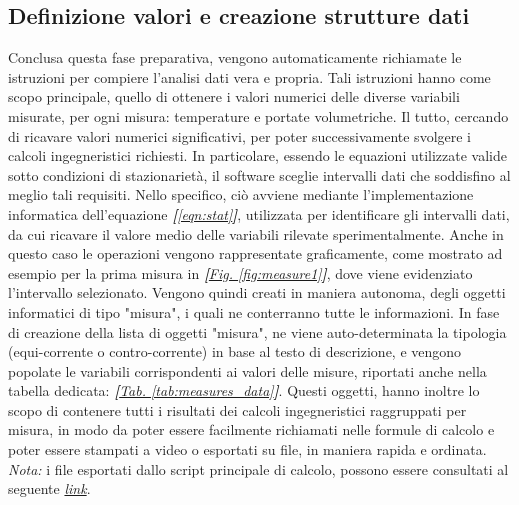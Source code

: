\documentclass[a4paper,10pt]{article}                                                                                       %
\begin{document}
\subsection{Definizione valori e creazione strutture dati}                                                                  %
\label{subsec:valsdef_datastruct}                                                                                           %
  Conclusa questa fase preparativa, vengono automaticamente richiamate le istruzioni per compiere l'analisi dati vera e
  propria. Tali istruzioni hanno come scopo principale, quello di ottenere i valori numerici delle diverse variabili
  misurate, per ogni misura: temperature e portate volumetriche. Il tutto, cercando di ricavare valori numerici
  significativi, per poter successivamente svolgere i calcoli ingegneristici richiesti. In particolare, essendo le
  equazioni utilizzate valide sotto condizioni di stazionarietà, il software sceglie intervalli dati che soddisfino
  al meglio tali requisiti. Nello specifico, ciò avviene mediante l'implementazione informatica dell'equazione
  \textit{\textbf{[}\ref{eqn:stat}\textbf{]}}, utilizzata per identificare gli intervalli dati, da cui ricavare il valore
  medio delle variabili rilevate sperimentalmente. Anche in questo caso le operazioni vengono rappresentate graficamente,
  come mostrato ad esempio per la prima misura in
  \textit{\textbf{[}\hyperref[fig:measure1]{Fig. }\ref{fig:measure1}\textbf{]}}, dove viene evidenziato l'intervallo
  selezionato. Vengono quindi creati in maniera autonoma, degli oggetti informatici di tipo "misura", i quali ne
  conterranno tutte le informazioni. In fase di creazione della lista di oggetti "misura", ne viene auto-determinata la
  tipologia (equi-corrente o contro-corrente) in base al testo di descrizione, e vengono popolate le variabili
  corrispondenti ai valori delle misure, riportati anche nella tabella dedicata:
  \textit{\textbf{[}\hyperref[tab:measures_data]{Tab. }\ref{tab:measures_data}\textbf{]}}. Questi oggetti, hanno inoltre
  lo scopo di contenere tutti i risultati dei calcoli ingegneristici raggruppati per misura, in modo da poter essere
  facilmente richiamati nelle formule di calcolo e poter essere stampati a video o esportati su file, in maniera rapida
  e ordinata.\vspace{2mm}\\
  \textit{Nota:} i file esportati dallo script principale di calcolo, possono essere consultati al seguente
  \textit{\href{https://github.com/CristianMerli/DataAnalysis/tree/master/final_doc/code_exports/output}{link}}.
\end{document}
